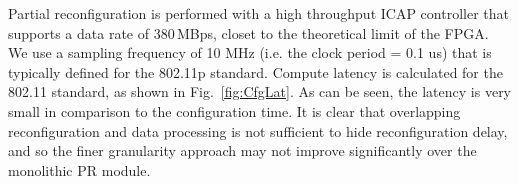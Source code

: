 Partial reconfiguration is performed with a high throughput ICAP controller that supports a data rate of 380\,MBps, closet to the theoretical limit of the FPGA.
We use a sampling frequency of 10 MHz (i.e. the clock period = 0.1 us) that is typically defined for the 802.11p standard. %
Compute latency is calculated for the 802.11 standard, as shown in Fig.~\ref{fig:CfgLat}.
As can be seen, the latency is very small in comparison to the configuration time.%
It is clear that overlapping reconfiguration and data processing is not sufficient to hide reconfiguration delay, and so the finer granularity approach may not improve significantly over the monolithic PR module.
